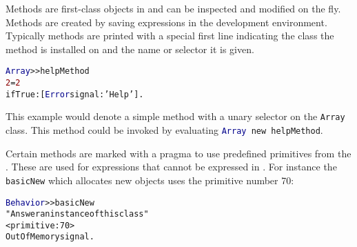 Methods are first-class objects in \PH and can be inspected and modified on the fly.
Methods are created by saving expressions in the \PH development environment.
Typically methods are printed with a special first line indicating the class the method is installed on and the name or selector it is given.

\begin{alltt}
\textcolor{darkBlue}{Array} >> helpMethod
    \textcolor{darkRed}{2} = \textcolor{darkRed}{2}
        ifTrue: [ \textcolor{darkBlue}{Error} signal: \textcolor{string}{'Help'} ].
\end{alltt}

This example would denote a simple method with a unary selector on the \texttt{Array} class.
This method could be invoked by evaluating \texttt{\textcolor{darkBlue}{Array} new helpMethod}.

Certain methods are marked with a pragma to use predefined primitives from the \VM.
These are used for expressions that cannot be expressed in \PH.
For instance the \texttt{basicNew} which allocates new objects uses the primitive number 70:

\begin{alltt}
\textcolor{darkBlue}{Behavior} >> basicNew
    \textcolor{comment}{"Answer an instance of this class"}
    <primitive: 70>
    OutOfMemory signal.
\end{alltt}



